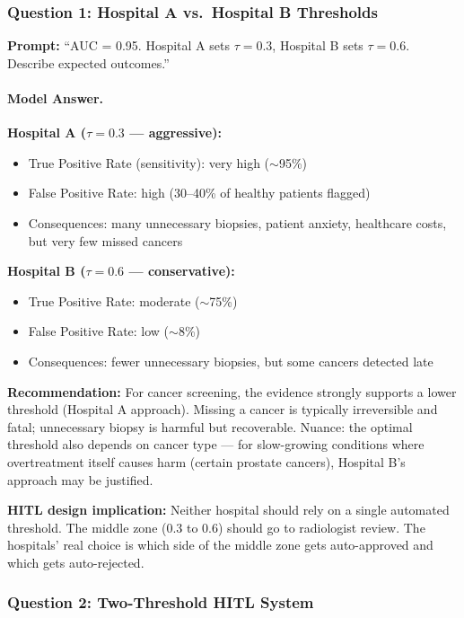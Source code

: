 \subsubsection{Question 1: Hospital A vs.\ Hospital B Thresholds}

\textbf{Prompt:} ``AUC = 0.95. Hospital A sets $\tau = 0.3$, Hospital B sets $\tau = 0.6$. Describe expected outcomes.''

\paragraph{Model Answer.}

\textbf{Hospital A ($\tau = 0.3$ --- aggressive):}
\begin{itemize}
    \item True Positive Rate (sensitivity): very high ($\sim$95\%)
    \item False Positive Rate: high (30--40\% of healthy patients flagged)
    \item Consequences: many unnecessary biopsies, patient anxiety, healthcare costs, but very few missed cancers
\end{itemize}

\textbf{Hospital B ($\tau = 0.6$ --- conservative):}
\begin{itemize}
    \item True Positive Rate: moderate ($\sim$75\%)
    \item False Positive Rate: low ($\sim$8\%)
    \item Consequences: fewer unnecessary biopsies, but some cancers detected late
\end{itemize}

\textbf{Recommendation:} For cancer screening, the evidence strongly supports a lower threshold (Hospital A approach). Missing a cancer is typically irreversible and fatal; unnecessary biopsy is harmful but recoverable. Nuance: the optimal threshold also depends on cancer type --- for slow-growing conditions where overtreatment itself causes harm (certain prostate cancers), Hospital B's approach may be justified.

\textbf{HITL design implication:} Neither hospital should rely on a single automated threshold. The middle zone (0.3 to 0.6) should go to radiologist review. The hospitals' real choice is which side of the middle zone gets auto-approved and which gets auto-rejected.

\subsubsection{Question 2: Two-Threshold HITL System}

